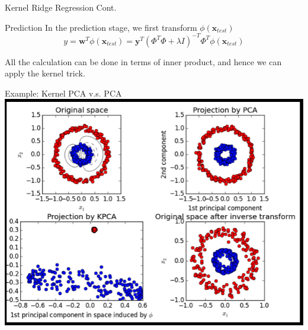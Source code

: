 \documentclass[10pt, compress]{beamer}
\begin{document}
\begin{frame}[fragile]{Kernel Ridge Regression Cont.}
  \begin{block}{Prediction}
    In the prediction stage, we first transform \( \phi(\mathbf{x}_{test}) \)
    \[
      y = \mathbf{w}^T \phi(\mathbf{x}_{test}) = \mathbf{y}^T {(\Phi^T \Phi + \lambda I)}^{-T} {\Phi}^T \phi(\mathbf{x}_{test})
    \]

    All the calculation can be done in terms of inner product, and hence we can apply the kernel trick.
  \end{block}
\end{frame}

\begin{frame}[fragile]{Example: Kernel PCA v.s. PCA}
  \includegraphics[width=\textwidth, height=.7\textheight]{images/KPCA.png}
\end{frame}
\end{document}
